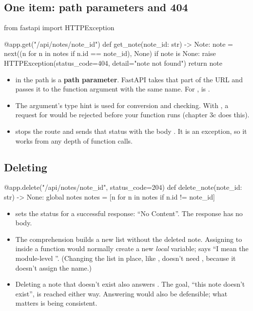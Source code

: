 \subsection{One item: path parameters and 404}

\begin{py}
from fastapi import HTTPException


@app.get("/api/notes/{note_id}")
def get_note(note_id: str) -> Note:
	note = next((n for n in notes if n.id == note_id), None)
	if note is None:
		raise HTTPException(status_code=404, detail="note not found")
	return note
\end{py}

\begin{itemize}
\item {} in the path is a \textbf{path parameter}. FastAPI takes that part of the URL and passes it to the function argument with the same name. For ,  is .
\item The argument's type hint is used for conversion and checking. With , a request for  would be rejected before your function runs (chapter 3c does this).
\item {} stops the route and sends that status with the body . It is an exception, so it works from any depth of function calls.
\end{itemize}

\subsection{Deleting}

\begin{py}
@app.delete("/api/notes/{note_id}", status_code=204)
def delete_note(note_id: str) -> None:
	global notes
	notes = [n for n in notes if n.id != note_id]
\end{py}

\begin{itemize}
\item {} sets the status for a successful response: ``No Content''. The response has no body.
\item The comprehension builds a new list without the deleted note. Assigning to  inside a function would normally create a new \emph{local} variable;  says ``I mean the module-level ''. (Changing the list in place, like , doesn't need , because it doesn't assign the name.)
\item Deleting a note that doesn't exist also answers . The goal, ``this note doesn't exist'', is reached either way. Answering  would also be defensible; what matters is being consistent.
\end{itemize}

